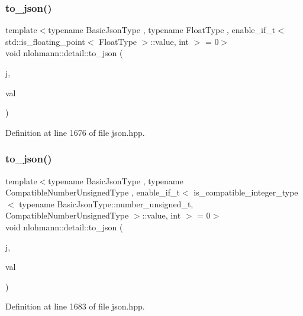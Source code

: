 \subsubsection{\texorpdfstring{to\+\_\+json()}{to\_json()}\hspace{0.1cm}{\footnotesize\ttfamily [4/16]}}
{\footnotesize\ttfamily template$<$typename Basic\+Json\+Type , typename Float\+Type , enable\+\_\+if\+\_\+t$<$ std\+::is\+\_\+floating\+\_\+point$<$ Float\+Type $>$\+::value, int $>$  = 0$>$ \\
void nlohmann\+::detail\+::to\+\_\+json (\begin{DoxyParamCaption}\item[{Basic\+Json\+Type \&}]{j,  }\item[{Float\+Type}]{val }\end{DoxyParamCaption})\hspace{0.3cm}{\ttfamily [noexcept]}}



Definition at line 1676 of file json.\+hpp.

\mbox{\label{namespacenlohmann_1_1detail_ae5fd66b5517b3b5a6c6b9fd9f29ba8dc}} 
\subsubsection{\texorpdfstring{to\+\_\+json()}{to\_json()}\hspace{0.1cm}{\footnotesize\ttfamily [5/16]}}
{\footnotesize\ttfamily template$<$typename Basic\+Json\+Type , typename Compatible\+Number\+Unsigned\+Type , enable\+\_\+if\+\_\+t$<$ is\+\_\+compatible\+\_\+integer\+\_\+type$<$ typename Basic\+Json\+Type\+::number\+\_\+unsigned\+\_\+t, Compatible\+Number\+Unsigned\+Type $>$\+::value, int $>$  = 0$>$ \\
void nlohmann\+::detail\+::to\+\_\+json (\begin{DoxyParamCaption}\item[{Basic\+Json\+Type \&}]{j,  }\item[{Compatible\+Number\+Unsigned\+Type}]{val }\end{DoxyParamCaption})\hspace{0.3cm}{\ttfamily [noexcept]}}



Definition at line 1683 of file json.\+hpp.

